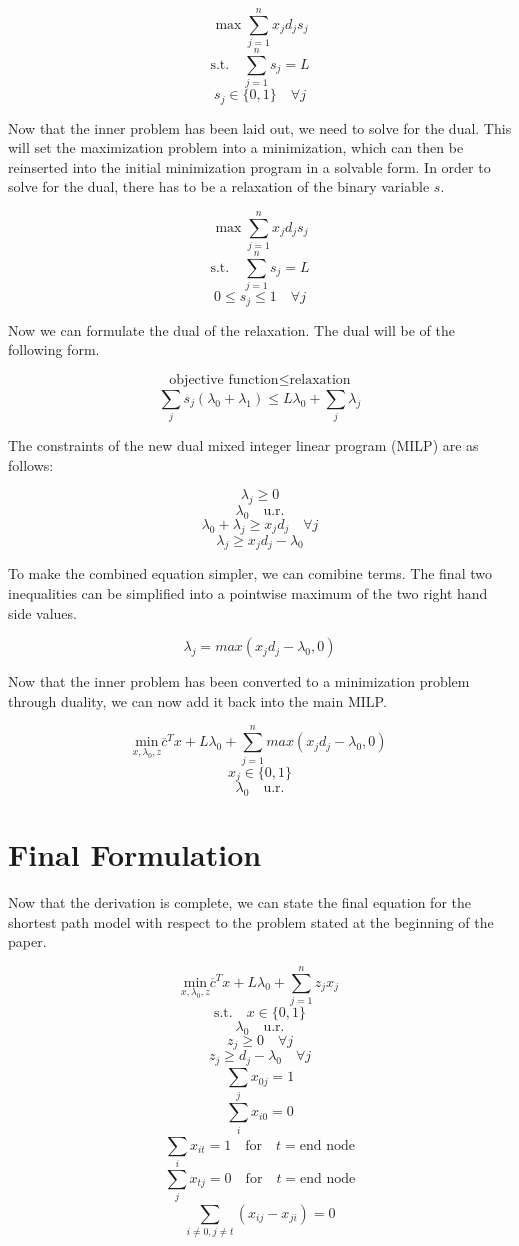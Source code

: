 \documentclass{article}
\begin{document}
$$
\max \sum_{j = 1}^{n} x_{j}d_{j}s_{j}
$$
$$
\textrm{s.t.} \quad \sum_{j =1}^{n} s_{j} = L
$$
$$
s_{j} \in \{0,1\} \quad \forall j
$$

Now that the inner problem has been laid out, we need to solve for the dual. This will set the maximization problem into a minimization, which can then be reinserted into the initial minimization program in a solvable form. In order to solve for the dual, there has to be a relaxation of the binary variable $s$.

$$
\max \sum_{j = 1}^{n} x_{j}d_{j}s_{j}
$$
$$
\textrm{s.t.} \quad \sum_{j =1}^{n} s_{j} = L
$$
$$
0 \leq s_{j} \leq 1 \quad \forall j
$$

Now we can formulate the dual of the relaxation. The dual will be of the following form.

$$ \textrm{objective function} \leq \textrm{relaxation}
$$
$$
\sum_{j}^{} s_{j} \left( \lambda_0 + \lambda_1 \right) \leq L \lambda_0 + \sum_{j}^{} \lambda_j
$$

The constraints of the new dual mixed integer linear program (MILP) are as follows:

$$
\lambda_j \geq 0
$$
$$
\lambda_0 \quad \textrm{u.r.}
$$
$$
\lambda_0 + \lambda_j \geq x_j d_j \quad \forall j
$$
$$
\lambda_j \geq x_j d_j - \lambda_0
$$

To make the combined equation simpler, we can comibine terms. The final two inequalities can be simplified into a pointwise maximum of the two right hand side values.

$$
\lambda_j = max \left(x_j d_j - \lambda_0 ,0\right)
$$


Now that the inner problem has been converted to a minimization problem through duality, we can now add it back into the main MILP.

$$
\underset{x,\lambda_0,z}{\textrm{min}} \overline{c}^T x + L \lambda_0 + \sum_{j = 1}^{n} max \left(x_j d_j - \lambda_0 ,0\right)
$$
$$
x_j \in \{0,1\}
$$
$$
\lambda_0 \quad \textrm{u.r.}
$$

\section{Final Formulation}
Now that the derivation is complete, we can state the final equation for the shortest path model with respect to the problem stated at the beginning of the paper. 

$$
\underset{x,\lambda_0,z}{\textrm{min}} \overline{c}^T x + L \lambda_0 + \sum_{j = 1}^{n} z_{j} x_{j}
$$
$$
\textrm{s.t.} \quad x \in \{0,1\}
$$
$$
\lambda_0 \quad \textrm{u.r.}
$$
$$
z_{j} \geq 0 \quad \forall j
$$
$$
z_{j} \geq d_{j} - \lambda_0 \quad \forall j
$$
$$
\sum_{j}^{} x_{0j} = 1
$$
$$
\sum_{i}^{} x_{i0} = 0
$$
$$
\sum_{i}^{} x_{it} = 1 \quad \textrm{for} \quad t = \textrm{end node}
$$
$$
\sum_{j}^{} x_{tj} = 0 \quad \textrm{for} \quad t = \textrm{end node}
$$
$$
\sum_{i \neq 0, j \neq t}^{} \left( x_{ij} - x_{ji} \right) = 0
$$
\end{document}
